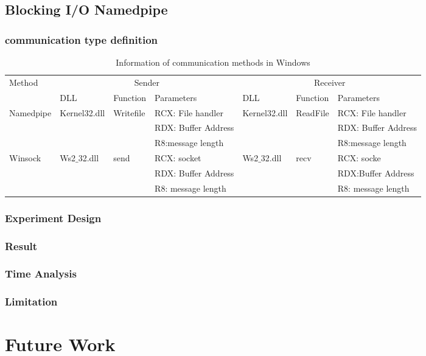 \documentclass[paper=a4, fontsize=11pt]{scrartcl}
\numberwithin{equation}{section}		%
\numberwithin{figure}{section}			%
\numberwithin{table}{section}				%
\begin{document}
\subsection{Blocking I/O Namedpipe}
\subsubsection{communication type definition}
\begin{table}
        \centering
        \caption{Information of communication methods in Windows}
        \label{communicatemethod}
        \begin{tabular}{|l|l|l|l|l|l|l|}
            \hline
             \multirow{2}{*}{Method} &
               \multicolumn{3}{c|}{Sender} &
               \multicolumn{3}{c|}{Receiver} \\
             \cline{2-7}
             &  DLL & Function& Parameters & DLL  & Function & Parameters\\
             \hline
             Namedpipe& Kernel32.dll& Writefile&  RCX: File handler & Kernel32.dll & ReadFile &  RCX: File handler\\
             \cline{4-4} \cline{7-7}
             &&&RDX: Buffer Address&&&RDX: Buffer Address\\
              \cline{4-4} \cline{7-7}
               &&&R8:message length&&&R8:message length\\
               \hline
             Winsock & Ws2$\_$32.dll & send & RCX: socket & Ws2$\_$32.dll & recv & RCX: socke \\
              \cline{4-4} \cline{7-7}
             &&&RDX: Buffer Address&&&RDX:Buffer Address\\
              \cline{4-4} \cline{7-7}
               &&&R8: message length&&&R8: message length\\
            \hline
        \end{tabular}
    \end{table}
\subsubsection{Experiment Design}
\subsubsection{Result}
\subsubsection{Time Analysis}
\subsubsection{Limitation}

\section{Future Work}



 


\end{document}
